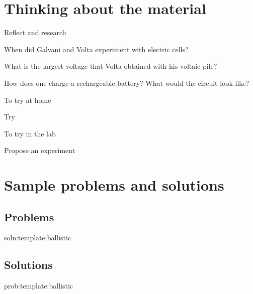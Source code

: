 \newpage
\section{Thinking about the material}

\begin{chapteractivity}{Reflect and research}
{
\item When did Galvani and Volta experiment with electric cells?
\item What is the largest voltage that Volta obtained with his voltaic pile?
\item How does one charge a rechargeable battery? What would the circuit look like?
}
\end{chapteractivity}

\begin{chapteractivity}{To try at home}
{
\item Try
}
\end{chapteractivity}

\begin{chapteractivity}{To try in the lab}
{
\item Propose an experiment
}
\end{chapteractivity}

\newpage
\section{Sample problems and solutions}

\subsection{Problems}
\begin{problem}{soln:template:ballistic}{\label{prob:template:ballistic} 

}
\end{problem}

\newpage
\subsection{Solutions}
\begin{solution}{prob:template:ballistic}\label{soln:template:ballistic}

\end{solution}


